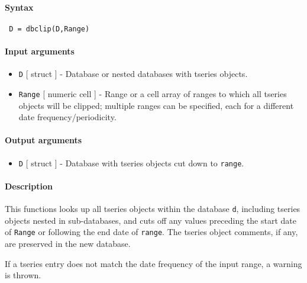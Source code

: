 


	\paragraph{Syntax}
 
 \begin{verbatim}
 D = dbclip(D,Range)
 \end{verbatim}
 
 \paragraph{Input arguments}
 
 \begin{itemize}
 \item
   \texttt{D} {[} struct {]} - Database or nested databases with tseries
   objects.
 \item
   \texttt{Range} {[} numeric \textbar{} cell {]} - Range or a cell array
   of ranges to which all tseries objects will be clipped; multiple
   ranges can be specified, each for a different date
   frequency/periodicity.
 \end{itemize}
 
 \paragraph{Output arguments}
 
 \begin{itemize}
 \item
   \texttt{D} {[} struct {]} - Database with tseries objects cut down to
   \texttt{range}.
 \end{itemize}
 
 \paragraph{Description}
 
 This functions looks up all tseries objects within the database
 \texttt{d}, including tseries objects nested in sub-databases, and cuts
 off any values preceding the start date of \texttt{Range} or following
 the end date of \texttt{range}. The tseries object comments, if any, are
 preserved in the new database.
 
 If a tseries entry does not match the date frequency of the input range,
 a warning is thrown.
 
